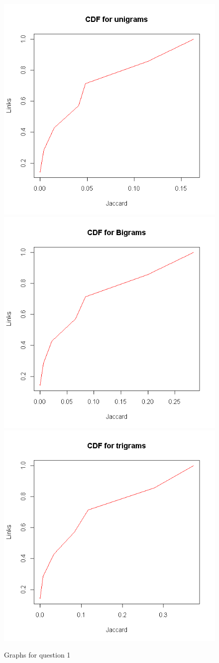 \documentclass[12pt]{article} %
\begin{document}
\begin{figure}
\includegraphics[width=.5\textwidth]{cdf-uni.png}
\includegraphics[width=.5\textwidth]{cdf-bi.png}
\includegraphics[width=.5\textwidth]{cdf-tri.png}
\caption{Graphs for question 1}
\end{figure}
\end{document}
